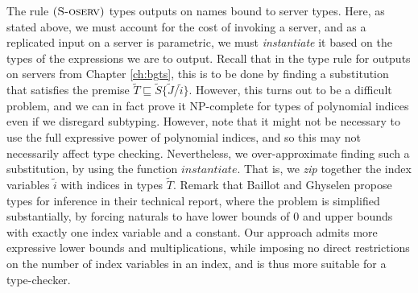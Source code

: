 The rule $\mbox{\textsc{\protect{(S-oserv})}}$ types outputs on names bound to server types. Here, as stated above, we must account for the cost of invoking a server, and as a replicated input on a server is parametric, we must \textit{instantiate} it based on the types of the expressions we are to output. Recall that in the type rule for outputs on servers from Chapter \ref{ch:bgts}, this is to be done by finding a substitution that satisfies the premise $\widetilde{T} \sqsubseteq \widetilde{S}\{\widetilde{J}/\widetilde{i}\}$. However, this turns out to be a difficult problem, and we can in fact prove it NP-complete for types of polynomial indices even if we disregard subtyping. However, note that it might not be necessary to use the full expressive power of polynomial indices, and so this may not necessarily affect type checking. Nevertheless, we over-approximate finding such a substitution, by using the function $\textit{instantiate}$. That is, we \textit{zip} together the index variables $\widetilde{i}$ with indices in types $\widetilde{T}$. Remark that Baillot and Ghyselen \cite{BaillotGhyselen2021} propose types for inference in their technical report, where the problem is simplified substantially, by forcing naturals to have lower bounds of $0$ and upper bounds with exactly one index variable and a constant. Our approach admits more expressive lower bounds and multiplications, while imposing no direct restrictions on the number of index variables in an index, and is thus more suitable for a type-checker.\\

